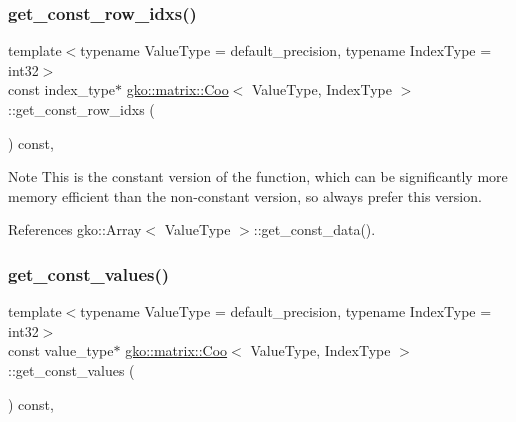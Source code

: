 \subsubsection{\texorpdfstring{get\+\_\+const\+\_\+row\+\_\+idxs()}{get\_const\_row\_idxs()}}
{\footnotesize\ttfamily template$<$typename Value\+Type = default\+\_\+precision, typename Index\+Type = int32$>$ \\
const index\+\_\+type$\ast$ \hyperlink{classgko_1_1matrix_1_1Coo}{gko\+::matrix\+::\+Coo}$<$ Value\+Type, Index\+Type $>$\+::get\+\_\+const\+\_\+row\+\_\+idxs (\begin{DoxyParamCaption}{ }\end{DoxyParamCaption}) const\hspace{0.3cm}{\ttfamily [inline]}, {\ttfamily [noexcept]}}





\begin{DoxyNote}{Note}
This is the constant version of the function, which can be significantly more memory efficient than the non-\/constant version, so always prefer this version. 
\end{DoxyNote}


References gko\+::\+Array$<$ Value\+Type $>$\+::get\+\_\+const\+\_\+data().

\mbox{\label{classgko_1_1matrix_1_1Coo_af0f6fe19d81bc4207aad66376f9c87c5}} 
\subsubsection{\texorpdfstring{get\+\_\+const\+\_\+values()}{get\_const\_values()}}
{\footnotesize\ttfamily template$<$typename Value\+Type = default\+\_\+precision, typename Index\+Type = int32$>$ \\
const value\+\_\+type$\ast$ \hyperlink{classgko_1_1matrix_1_1Coo}{gko\+::matrix\+::\+Coo}$<$ Value\+Type, Index\+Type $>$\+::get\+\_\+const\+\_\+values (\begin{DoxyParamCaption}{ }\end{DoxyParamCaption}) const\hspace{0.3cm}{\ttfamily [inline]}, {\ttfamily [noexcept]}}



